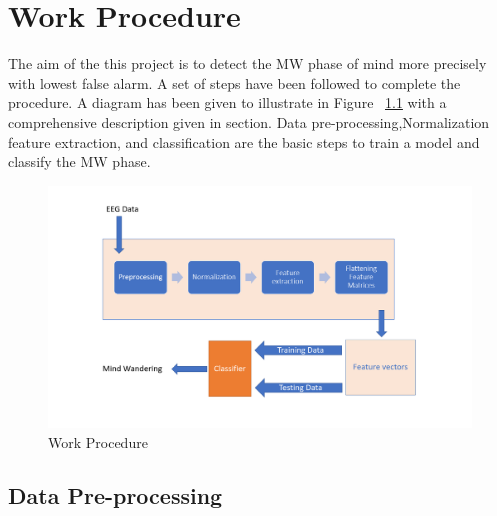 
\chapter{Work Procedure} %

\label{Chapter4} %


The aim of the this project is to detect the MW phase of mind more precisely with lowest false alarm. A set of steps have been followed to complete the procedure. A diagram has been given to illustrate in Figure ~\ref{fig:work_procedure} with a comprehensive description given in section. Data pre-processing,Normalization feature extraction, and classification are the basic steps to train a model and classify the MW phase.


\begin{figure}
    \centering
    \includegraphics[width=15cm]{Pictures/workprocedure.png}
    \caption{Work Procedure }
    \label{fig:work_procedure}
\end{figure}

\section{Data Pre-processing}

